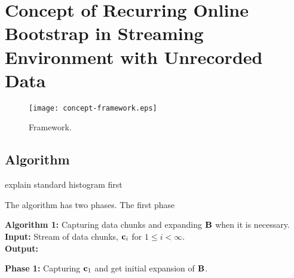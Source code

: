 \documentclass[lettersize,journal]{IEEEtran}
\begin{document}
\section{Concept of Recurring Online Bootstrap in Streaming Environment with Unrecorded Data}

\begin{figure*}[!th]
\centering
\texttt{[image: concept-framework.eps]} 
\caption{Framework.} 
\label{frame-work}
\end{figure*}

\subsection{Algorithm}
explain standard histogram first 

The algorithm has two phases. The first phase

\vspace{0.2in}
\noindent
{\bf Algorithm 1:} Capturing data chunks and expanding ${\bf B}$ when it is necessary. \\

\noindent
{\bf Input:} Stream of data chunks, ${\bf c}_{i}$ for $1 \leq i < \infty$. \\
{\bf Output:}

\vspace{0.2in}
\noindent
{\bf Phase 1:} Capturing ${\bf c}_{1}$ and get initial expansion of ${\bf B}$.
\end{document}
